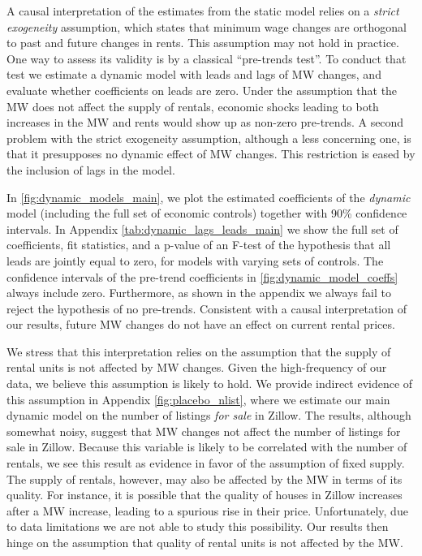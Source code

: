 A causal interpretation of the estimates from the static model relies on a \textit{strict exogeneity} 
assumption, which states that minimum wage changes are orthogonal to past and future changes in rents.
This assumption may not hold in practice. One way to assess its validity is by a classical 
``pre-trends test''. To conduct that test we estimate a dynamic model with leads and lags of MW 
changes, and evaluate whether coefficients on leads are zero. Under the assumption that the MW does 
not affect the supply of rentals, economic shocks leading to both increases in the MW and rents would 
show up as non-zero pre-trends. A second problem with the strict exogeneity assumption, although a less 
concerning one, is that it presupposes no dynamic effect of MW changes. This restriction is eased by 
the inclusion of lags in the model.

In \autoref{fig:dynamic_models_main}, we plot the estimated coefficients of the \textit{dynamic} model 
(including the full set of economic controls) together with 90\% confidence intervals. In
Appendix \autoref{tab:dynamic_lags_leads_main} we show the full set of coefficients, fit 
statistics, and a p-value of an F-test of the hypothesis that all leads are jointly equal to zero, 
for models with varying sets of controls. The confidence intervals of the pre-trend coefficients in 
\autoref{fig:dynamic_model_coeffs} always include zero. Furthermore, as shown in the appendix we 
always fail to reject the hypothesis of no pre-trends. Consistent with a causal interpretation of 
our results, future MW changes do not have an effect on current rental prices. 

We stress that this interpretation relies on the assumption that the supply of rental units is 
not affected by MW changes. Given the high-frequency of our data, we believe this assumption is 
likely to hold. We provide indirect evidence of this assumption in Appendix
\autoref{fig:placebo_nlist}, where we estimate our main dynamic model on the number of listings 
\textit{for sale} in Zillow. The results, although somewhat noisy, suggest that MW changes not 
affect the number of listings for sale in Zillow. Because this variable is likely to be correlated 
with the number of rentals, we see this result as evidence in favor of the assumption of fixed supply. 
The supply of rentals, however, may also be affected by the MW in terms of its quality. For instance, 
it is possible that the quality of houses in Zillow increases after a MW increase, leading to a 
spurious rise in their price.  Unfortunately, due to data limitations we are not able to study this 
possibility. Our results then hinge on the assumption that quality of rental units is not affected 
by the MW.


